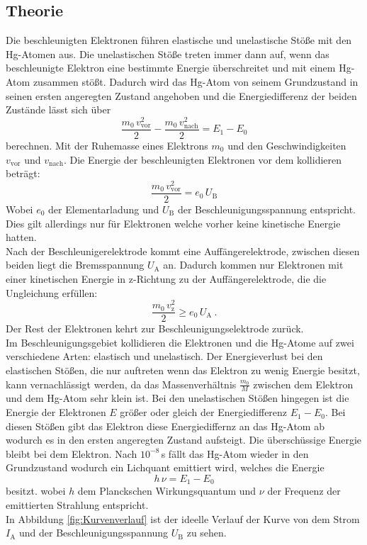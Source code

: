 \subsection{Theorie}
Die beschleunigten Elektronen führen elastische und unelastische Stöße mit den Hg-Atomen aus. Die unelastischen Stöße treten immer dann auf, wenn das beschleunigte Elektron eine bestimmte Energie überschreitet und mit einem Hg-Atom zusammen stößt. Dadurch wird das Hg-Atom von seinem Grundzustand in seinen ersten angeregten Zustand angehoben und die Energiedifferenz der beiden Zustände lässt sich über
\begin{equation}
	\frac{m_0\, v_\text{vor}^2}{2} - \frac{m_0\, v_\text{nach}^2}{2} = E_1 - E_0
\end{equation}
berechnen. Mit der Ruhemasse eines Elektrons $m_0$ und den Geschwindigkeiten $v_\text{vor}$ und $v_\text{nach}$. Die Energie der beschleunigten Elektronen vor dem kollidieren beträgt:
\begin{equation}
	\frac{m_0\, v_\text{vor}^2}{2} = e_0\, U_\text{B}
\end{equation}
Wobei $e_0$ der Elementarladung und $U_\text{B}$ der Beschleunigungsspannung entspricht. Dies gilt allerdings nur für Elektronen welche vorher keine kinetische Energie hatten. \\
Nach der Beschleunigerelektrode kommt eine Auffängerelektrode, zwischen diesen beiden liegt die Bremsspannung $U_\text{A}$ an. Dadurch kommen nur Elektronen mit einer kinetischen Energie in z-Richtung zu der Auffängerelektrode, die die Ungleichung erfüllen:
\begin{equation}
	\frac{m_0\, v_\text{z}^2}{2} \ge e_0\, U_\text{A} \ .
\end{equation}
Der Rest der Elektronen kehrt zur Beschleunigungselektrode zurück. \\
Im Beschleunigungsgebiet kollidieren die Elektronen und die Hg-Atome auf zwei verschiedene Arten: elastisch und unelastisch. Der Energieverlust bei den elastischen Stößen, die nur auftreten wenn das Elektron zu wenig Energie besitzt, kann vernachlässigt werden, da das Massenverhältnis $\frac{m_0}{M}$ zwischen dem Elektron und dem Hg-Atom sehr klein ist. Bei den unelastischen Stößen hingegen ist die Energie der Elektronen $E$ größer oder gleich der Energiedifferenz $E_1 - E_0$. Bei diesen Stößen gibt das Elektron diese Energiediffernz an das Hg-Atom ab wodurch es in den ersten angeregten Zustand aufsteigt. Die überschüssige Energie bleibt bei dem Elektron. Nach $10^{-8}$\,s fällt das Hg-Atom wieder in den Grundzustand wodurch ein Lichquant emittiert wird, welches die Energie
\begin{equation}
	h\, \nu = E_1 - E_0
\end{equation}
besitzt. wobei $h$ dem Planckschen Wirkungsquantum und $\nu$ der Frequenz der emittierten Strahlung entspricht. \\
In Abbildung \eqref{fig:Kurvenverlauf} ist der ideelle Verlauf der Kurve von dem Strom $I_\text{A}$ und der Beschleunigungsspannung $U_\text{B}$ zu sehen.

